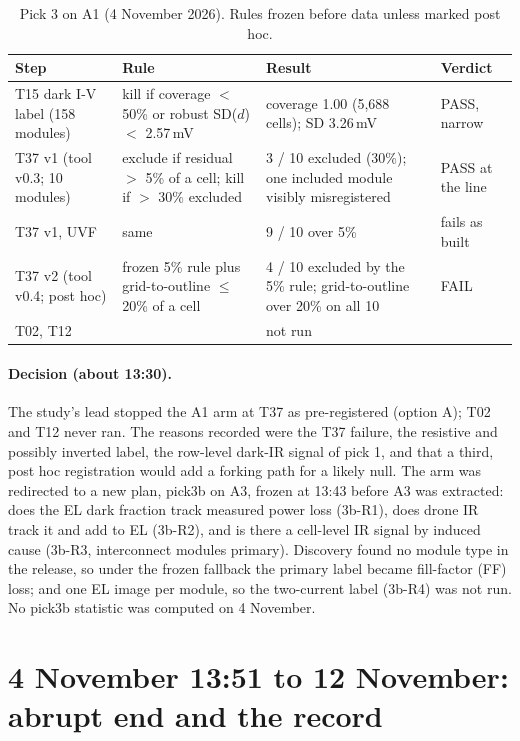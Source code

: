 \begin{table}[htbp]
\centering\small
\caption{Pick 3 on A1 (4 November 2026). Rules frozen before data unless marked post hoc.}
\label{tab:thermal-pick3}
\begin{tabular}{@{}p{2.6cm}p{4.4cm}p{4.4cm}p{2.2cm}@{}}
\toprule
Step & Rule & Result & Verdict \\
\midrule
T15 dark I-V label (158 modules) & kill if coverage $<$ 50\% or robust SD($d$) $<$ 2.57\,mV & coverage 1.00 (5,688 cells); SD 3.26\,mV & PASS, narrow \\
T37 v1 (tool v0.3; 10 modules) & exclude if residual $>$ 5\% of a cell; kill if $>$ 30\% excluded & 3 / 10 excluded (30\%); one included module visibly misregistered & PASS at the line \\
T37 v1, UVF & same & 9 / 10 over 5\% & fails as built \\
T37 v2 (tool v0.4; post hoc) & frozen 5\% rule plus grid-to-outline $\leq$ 20\% of a cell & 4 / 10 excluded by the 5\% rule; grid-to-outline over 20\% on all 10 & FAIL \\
T02, T12 & & not run & \\
\bottomrule
\end{tabular}
\end{table}

\paragraph{Decision (about 13:30).} The study's lead stopped the A1 arm at T37 as pre-registered (option A); T02 and T12 never ran. The
reasons recorded were the T37 failure, the resistive and possibly inverted label, the row-level dark-IR signal of pick 1, and that a
third, post hoc registration would add a forking path for a likely null. The arm was redirected to a new plan, pick3b on A3, frozen at
13:43 before A3 was extracted: does the EL dark fraction track measured power loss (3b-R1), does drone IR track it and add to EL
(3b-R2), and is there a cell-level IR signal by induced cause (3b-R3, interconnect modules primary). Discovery found no module type in
the release, so under the frozen fallback the primary label became fill-factor (FF) loss; and one EL image per module, so the
two-current label (3b-R4) was not run. No pick3b statistic was computed on 4 November.

\section{4 November 13:51 to 12 November: abrupt end and the record}\label{sec:thermal-end}

